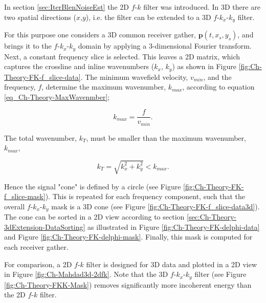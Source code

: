 In section \ref{sec:IterBlenNoiseEst} the 2D $f$-$k$ filter was introduced. In 3D there are two spatial directions ($x$,$y$), i.e. the filter can be extended to a 3D $f$-$k_x$-$k_y$ filter.

For this purpose one considers a 3D common receiver gather, $\mathbf{p}(t,x_s,y_s)$, and brings it to the $f$-$k_x$-$k_y$ domain by applying a 3-dimensional Fourier transform. Next, a constant frequency slice is selected. This leaves a 2D matrix, which captures the crossline and inline wavenumbers ($k_x$, $k_y$) as shown in Figure \ref{fig:Ch-Theory-FK-f_slice-data}. The minimum wavefield velocity, $v_{min}$, and the frequency, $f$, determine the maximum wavenumber, $k_{max}$, according to equation \ref{eq_Ch-Theory-MaxWavenmber};

\begin{equation}
	k_{max} = \frac{f}{v_{min}}.
	\label{eq_Ch-Theory-MaxWavenmber-Repetition}
\end{equation} 

The total wavenumber, $k_{T}$, must be smaller than the maximum wavenumber, $k_{max}$,

\begin{equation}
	k_{T} = \sqrt{k_x^2 + k_{y}^2} < k_{max}.
	\label{eq:Ch-Theory-TotalWavenumber}
\end{equation}

Hence the signal "cone" is defined by a circle (see Figure \ref{fig:Ch-Theory-FK-f_slice-mask}). This is repeated for each frequency component, such that the overall $f$-$k_x$-$k_y$ mask is a 3D cone (see Figure \ref{fig:Ch-Theory-FK-f_slice-data3d}). The cone can be sorted in a 2D view according to section \ref{sec:Ch-Theory-3dExtension-DataSorting} as illustrated in Figure \ref{fig:Ch-Theory-FK-delphi-data} and Figure \ref{fig:Ch-Theory-FK-delphi-mask}. Finally, this mask is computed for each receiver gather.

For comparison, a 2D $f$-$k$ filter is designed for 3D data and plotted in a 2D view in Figure \ref{fig:Ch-Mahdad3d-2dfk}. Note that the 3D $f$-$k_x$-$k_y$ filter (see Figure \ref{fig:Ch-Theory-FKK-Mask}) removes significantly more incoherent energy than the 2D $f$-$k$ filter. 



